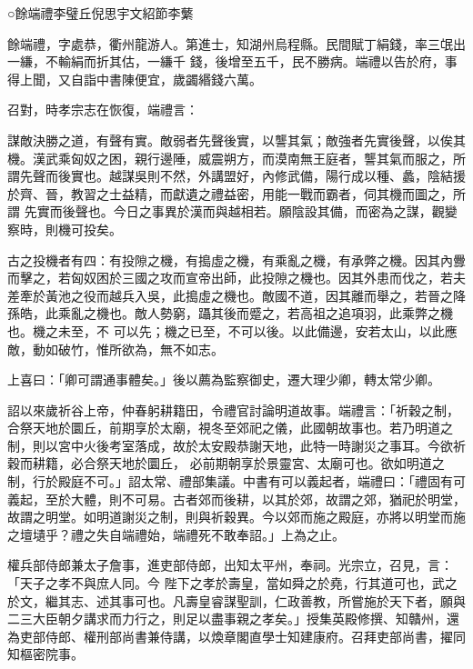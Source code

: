 
\begin{pinyinscope}

 ○餘端禮李璧丘倪思宇文紹節李蘩



 餘端禮，字處恭，衢州龍游人。第進士，知湖州烏程縣。民間賦丁絹錢，率三氓出一縑，不輸絹而折其估，一縑千
 錢，後增至五千，民不勝病。端禮以告於府，事得上聞，又自詣中書陳便宜，歲蠲緡錢六萬。



 召對，時孝宗志在恢復，端禮言：



 謀敵決勝之道，有聲有實。敵弱者先聲後實，以讋其氣；敵強者先實後聲，以俟其機。漢武乘匈奴之困，親行邊陲，威震朔方，而漠南無王庭者，讋其氣而服之，所謂先聲而後實也。越謀吳則不然，外講盟好，內修武備，陽行成以種、蠡，陰結援於齊、晉，教習之士益精，而獻遺之禮益密，用能一戰而霸者，伺其機而圖之，所謂
 先實而後聲也。今日之事異於漢而與越相若。願陰設其備，而密為之謀，觀變察時，則機可投矣。



 古之投機者有四：有投隙之機，有搗虛之機，有乘亂之機，有承弊之機。因其內釁而擊之，若匈奴困於三國之攻而宣帝出師，此投隙之機也。因其外患而伐之，若夫差牽於黃池之役而越兵入吳，此搗虛之機也。敵國不道，因其離而舉之，若晉之降孫皓，此乘亂之機也。敵人勢窮，躡其後而蹙之，若高祖之追項羽，此乘弊之機也。機之未至，不
 可以先；機之已至，不可以後。以此備邊，安若太山，以此應敵，動如破竹，惟所欲為，無不如志。



 上喜曰：「卿可謂通事體矣。」後以薦為監察御史，遷大理少卿，轉太常少卿。



 詔以來歲祈谷上帝，仲春躬耕籍田，令禮官討論明道故事。端禮言：「祈穀之制，合祭天地於圜丘，前期享於太廟，視冬至郊祀之儀，此國朝故事也。若乃明道之制，則以宮中火後考室落成，故於太安殿恭謝天地，此特一時謝災之事耳。今欲祈穀而耕籍，必合祭天地於圜丘，
 必前期朝享於景靈宮、太廟可也。欲如明道之制，行於殿庭不可。」詔太常、禮部集議。中書有可以義起者，端禮曰：「禮固有可義起，至於大體，則不可易。古者郊而後耕，以其於郊，故謂之郊，猶祀於明堂，故謂之明堂。如明道謝災之制，則與祈穀異。今以郊而施之殿庭，亦將以明堂而施之壇壝乎？禮之失自端禮始，端禮死不敢奉詔。」上為之止。



 權兵部侍郎兼太子詹事，進吏部侍郎，出知太平州，奉祠。光宗立，召見，言：「天子之孝不與庶人同。今
 陛下之孝於壽皇，當如舜之於堯，行其道可也，武之於文，繼其志、述其事可也。凡壽皇睿謀聖訓，仁政善教，所嘗施於天下者，願與二三大臣朝夕講求而力行之，則足以盡事親之孝矣。」授集英殿修撰、知贛州，還為吏部侍郎、權刑部尚書兼侍講，以煥章閣直學士知建康府。召拜吏部尚書，擢同知樞密院事。




\end{pinyinscope}
